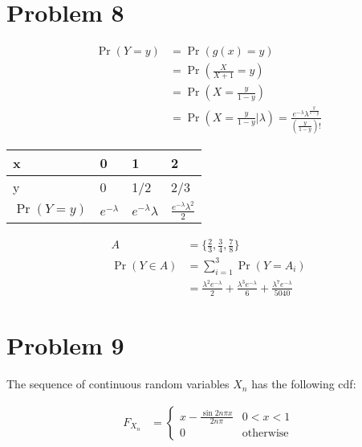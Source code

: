 \documentclass[11pt]{article}
\begin{document}
\section*{Problem 8}

\begin{align*}
  \Pr(Y = y) &= \Pr(g(x) = y) \\
  &= \Pr \left( \frac{X}{X+1} = y \right) \\
  &= \Pr \left( X = \frac{y}{1-y} \right) \\
  &= \Pr \left( X = \frac{y}{1-y} \bigg| \lambda \right) = \frac{e^{-\lambda} \lambda^{\frac{y}{1-y}}}{\left( \frac{y}{1-y}\right)!}
\end{align*}

\begin{center}
  \begin{tabular}{ | l | l | l | l | }
    \hline
    x & 0 & 1 & 2 \\ \hline
    y & 0 & 1/2 & 2/3 \\ \hline
    $\Pr(Y = y)$ & $e^{-\lambda}$ & $e^{-\lambda} \lambda$ & $\frac{e^{-\lambda} \lambda^2}{2}$ \\
    \hline
  \end{tabular}
\end{center}

\begin{align*}
  A &= \bigg\{ \frac{2}{3}, \frac{3}{4}, \frac{7}{8} \bigg\} \\
  \Pr(Y \in A) &= \sum_{i=1}^3 \Pr(Y = A_i) \\
  &= \frac{\lambda^2 e^{-\lambda}}{2} + \frac{\lambda^3 e^{-\lambda}}{6} + \frac{\lambda^7 e^{-\lambda}}{5040}
\end{align*}

\section*{Problem 9}

The sequence of continuous random variables $X_n$ has the following cdf:

\begin{align*}
  F_{X_n} &= 
  \begin{cases}
    x - \frac{\sin{2n \pi x}}{2n\pi} & 0 < x < 1 \\
    0 & \text{otherwise}
  \end{cases}
\end{align*}
\end{document}
